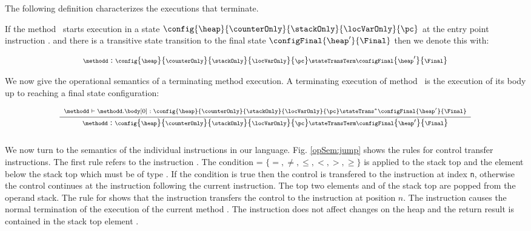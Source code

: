 The following definition characterizes the executions that terminate. 


 \begin{transClosStateTrans1} \label{stateTransClos}
   If  the method \methodd \  starts execution in a state $\config{ \heap}{\counterOnly}{\stackOnly}{\locVarOnly}{\pc}$   
   at the entry point instruction \mbox{\rm\methodd.\body[0]} 
   and there is a transitive state transition to the final state $\configFinal{ \heap'}{\Final}$ then   we denote this  with: 

    $$ {\scriptsize \methodd : \config{ \heap}{\counterOnly}{\stackOnly}{\locVarOnly}{ \pc } \stateTransTerm \configFinal{ \heap'}{\Final} }$$
 \end{transClosStateTrans1}
 



 We now give the operational semantics of a terminating method execution. A terminating execution of method \methodd \
 is the execution of its body up to reaching a final state configuration:
 
 $$
 {\scriptsize  \frac{\begin{array}{l}
          \methodd \vdash  \methodd.\body[0] :  
	                    \config{\heap}{\counterOnly}{\stackOnly}{\locVarOnly}{\pc}  \stateTrans^{*} \configFinal{\heap'}{\Final}\\
	\end{array}	 
       }
       {\methodd :  \config{\heap}{\counterOnly}{\stackOnly}{\locVarOnly}{\pc} 
		    \stateTransTerm
                   \configFinal{\heap'} {\Final} }}$$ \\


 

   

We now turn to the semantics of the individual instructions in our language. 
 Fig. \ref{opSem:jump} shows the rules for control transfer instructions. The first rule refers to
the instruction \ifCond. The condition \rel = $\{ =, \neq, \le, <, >, \ge \} $ is applied to the stack top  \stackOnlyParam{\counterOnly} and the element below the stack top 
\stackOnlyParam{\counterOnly -1}which must be of type \Myint. If the condition is true then the control is transfered to the instruction
  at index \texttt{n}, otherwise the control continues at the instruction following the current instruction. The top two elements \stackOnlyParam{\counterOnly} and
 \stackOnlyParam{\counterOnly - 1}  of the stack top are popped from the operand stack. The rule for \goto{} shows that the instruction
 transfers the control to the instruction at position $n$.   
 The instruction \return{} causes the normal termination of the execution of the current method \methodd.
 The instruction does not affect changes on the heap \heap{} and the return result is contained in 
 the stack top element \stackOnlyParam{\counterOnly}.


